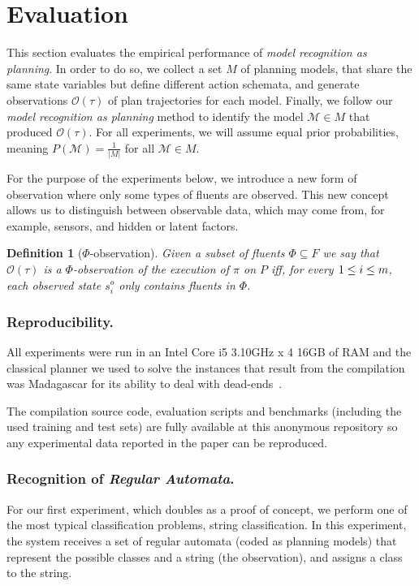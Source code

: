 \documentclass[letterpaper]{article} %
\newtheorem{definition}[theorem]{Definition}
\begin{document}
\section{Evaluation}
\label{sec:evaluation}

This section evaluates the empirical performance of {\em model recognition as planning}. In order to do so, we collect a set $M$ of planning models, that share the same state variables but define different action schemata, and generate observations $\mathcal{O}(\tau)$ of plan trajectories for each model. Finally, we follow our {\em model recognition as planning} method to identify the model $\mathcal{M}\in M$ that produced $\mathcal{O}(\tau)$. For all experiments, we will assume equal prior probabilities, meaning $P(\mathcal{M}) = \frac{1}{|M|}$ for all $\mathcal{M} \in M$. 

For the purpose of the experiments below, we introduce a new form of observation where only some types of fluents are observed. This new concept allows us to distinguish between observable data, which may come from, for example, sensors, and hidden or latent factors.
\begin{definition}[$\Phi$-observation]
Given a subset of fluents $\Phi\subseteq F$ we say that $\mathcal{O}(\tau)$ is a $\Phi$-observation of the execution of $\pi$ on $P$ iff, for every ${\small 1\leq i\leq m}$, each observed state $s_i^o$ only contains fluents in $\Phi$.
\end{definition}


\subsubsection{Reproducibility.} All experiments were run in an Intel Core i5 3.10GHz x 4 16GB of RAM and the classical planner we used to solve the instances that result from the compilation was {\sc Madagascar} for its ability to deal with dead-ends~\cite{rintanen2014madagascar}.

The compilation source code, evaluation scripts and benchmarks (including the used training and test sets) are fully available at this anonymous repository {\em } so any experimental data reported in the paper can be reproduced.

\subsubsection{Recognition of {\em Regular Automata}.} For our first experiment, which doubles as a proof of concept, we perform one of the most typical classification problems, string classification. In this experiment, the system receives a set of regular automata (coded as planning models) that represent the possible classes and a string (the observation), and assigns a class to the string.
\end{document}
